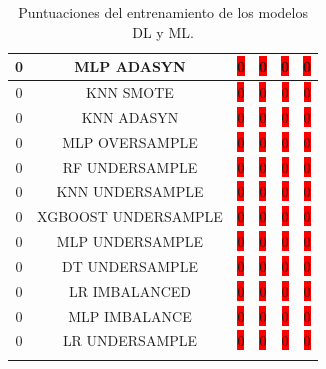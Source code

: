 \begin{longtable}{|c|c|c|c|c|c|}
	0 & MLP  ADASYN & \colorbox{red}{0} & \colorbox{red}{0} & \colorbox{red}{0} & \colorbox{red}{0}\\ \hline
	0 & KNN SMOTE & \colorbox{red}{0} & \colorbox{red}{0} & \colorbox{red}{0} & \colorbox{red}{0}\\ \hline
	0 & KNN ADASYN & \colorbox{red}{0} & \colorbox{red}{0} & \colorbox{red}{0} & \colorbox{red}{0}\\ \hline
	0 & MLP OVERSAMPLE & \colorbox{red}{0} & \colorbox{red}{0} & \colorbox{red}{0} & \colorbox{red}{0}\\ \hline
	0 & RF UNDERSAMPLE & \colorbox{red}{0} & \colorbox{red}{0} & \colorbox{red}{0} & \colorbox{red}{0}\\ \hline
	0 & KNN UNDERSAMPLE & \colorbox{red}{0} & \colorbox{red}{0} & \colorbox{red}{0} & \colorbox{red}{0}\\ \hline
	0 & XGBOOST UNDERSAMPLE & \colorbox{red}{0} & \colorbox{red}{0} & \colorbox{red}{0} & \colorbox{red}{0}\\ \hline
	0 & MLP UNDERSAMPLE & \colorbox{red}{0} & \colorbox{red}{0} & \colorbox{red}{0} & \colorbox{red}{0}\\ \hline
	0 & DT UNDERSAMPLE & \colorbox{red}{0} & \colorbox{red}{0} & \colorbox{red}{0} & \colorbox{red}{0}\\ \hline
	0 & LR IMBALANCED & \colorbox{red}{0} & \colorbox{red}{0} & \colorbox{red}{0} & \colorbox{red}{0}\\ \hline
	0 & MLP IMBALANCE & \colorbox{red}{0} & \colorbox{red}{0} & \colorbox{red}{0} & \colorbox{red}{0}\\ \hline
	0 & LR UNDERSAMPLE & \colorbox{red}{0} & \colorbox{red}{0} & \colorbox{red}{0} & \colorbox{red}{0}\\ \hline
	\caption{Puntuaciones del entrenamiento de los modelos DL y ML.}
	\label{an:51}
\end{longtable}